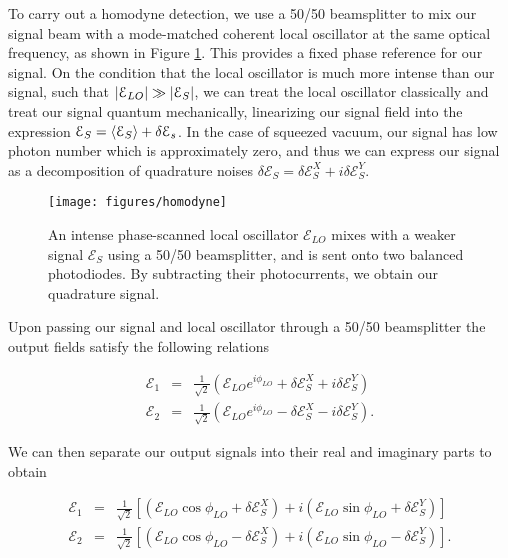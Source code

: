 To carry out a homodyne detection, we use a 50/50 beamsplitter to mix our signal beam with a mode-matched coherent local oscillator at the same optical frequency, as shown in Figure \ref{fig:homodyne}.  This provides a fixed phase reference for our signal.  On the condition that the local oscillator is much more intense than our signal, such that $\left| \mathcal{E}_{LO} \right| \gg \left| \mathcal{E}_{S} \right|$, we can treat the local oscillator classically and treat our signal quantum mechanically, linearizing our signal field into the expression $\mathcal{E}_{S} = \left< \mathcal{E}_S \right> + \delta \mathcal{E}_s$.  In the case of squeezed vacuum, our signal has low photon number which is approximately zero, and thus we can express our signal as a decomposition of quadrature noises $\delta \mathcal{E}_S = \delta \mathcal{E}^X_S + i\delta \mathcal{E}^Y_S$.

\begin{figure}[ht] 
 \centering
 \texttt{[image: figures/homodyne]} 
 \caption[Homodyne detection schematic]{An intense phase-scanned local oscillator $\mathcal{E}_{LO}$ mixes with a weaker signal $\mathcal{E}_S$ using a 50/50 beamsplitter, and is sent onto two balanced photodiodes.  By subtracting their photocurrents, we obtain our quadrature signal.}
 \label{fig:homodyne} 
\end{figure}


Upon passing our signal and local oscillator through a 50/50 beamsplitter the output fields satisfy the following relations




\begin{eqnarray}
  \label{eq:homodyne_bs_outputs}
  \mathcal{E}_1 & = & \frac{1}{\sqrt{2}} \left(\mathcal{E}_{LO} e^{i \phi_{LO}} + \delta \mathcal{E}^X_S + i \delta \mathcal{E}^Y_S  \right) \\
  \mathcal{E}_2 & = & \frac{1}{\sqrt{2}} \left(\mathcal{E}_{LO} e^{i \phi_{LO}} - \delta \mathcal{E}^X_S - i \delta \mathcal{E}^Y_S  \right) .
\end{eqnarray}

\noindent
We can then separate our output signals into their real and imaginary parts to obtain
 
\begin{eqnarray}
  \label{eq:homodyne_bs_outputs_reim}
  \mathcal{E}_1 & = & \frac{1}{\sqrt{2}} \left[ (\mathcal{E}_{LO} \cos \phi_{LO}  + \delta \mathcal{E}^X_S ) + i (\mathcal{E}_{LO} \sin \phi_{LO} + \delta \mathcal{E}^Y_S ) \right] \\
  \mathcal{E}_2 & = & \frac{1}{\sqrt{2}} \left[ (\mathcal{E}_{LO} \cos \phi_{LO}  - \delta \mathcal{E}^X_S ) + i (\mathcal{E}_{LO} \sin \phi_{LO} - \delta \mathcal{E}^Y_S ) \right]  .
\end{eqnarray}

